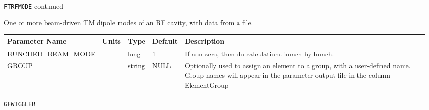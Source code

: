 \newpage
\begin{center}{\Large\verb|FTRFMODE| continued}\end{center}
One or more beam-driven TM dipole modes of an RF cavity, with data from a file.
\\
\begin{tabular}{|l|l|l|l|p{\descwidth}|} \hline
Parameter Name & Units & Type & Default & Description \\ \hline 
BUNCHED\_BEAM\_MODE &  & long &   1               & If non-zero, then do calculations bunch-by-bunch.  \\ \hline 
GROUP &  & string & NULL & Optionally used to assign an element to a group, with a user-defined name.  Group names will appear in the parameter output file in the column ElementGroup  \\ \hline 
\end{tabular}

\vspace*{0.5in}

\newpage
\begin{center}{\Large\verb|GFWIGGLER|}\end{center}
